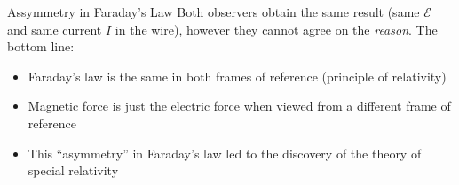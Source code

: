 \documentclass[12pt,aspectratio=169]{beamer}
\begin{document}
\begin{frame}{Assymmetry in Faraday's Law}
  Both observers obtain the same result (same $\mathcal E$ and same current $I$
  in the wire), however they cannot agree on the \emph{reason}. The bottom line:
  \begin{itemize}
  \item Faraday's law is the same in both frames of reference (principle of
    relativity)
  \item Magnetic force is just the electric force when viewed from a different
    frame of reference
  \item This ``asymmetry'' in Faraday's law led to the discovery of the theory
    of special relativity
  \end{itemize}
\end{frame}
\end{document}

